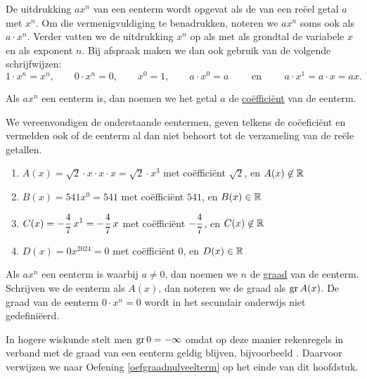\documentclass{ximera}
\begin{document}
De uitdrukking \( ax^n \) van een eenterm wordt opgevat als de  van een re\"eel getal \( a \) met \( x^n \). Om die vermenigvuldiging te benadrukken, noteren we \( ax^n \) soms ook als \( a \cdot x^n \). Verder vatten we de uitdrukking \( x^n \) op als  met als grondtal de variabele \( x \) en als exponent \( n \). Bij afspraak maken we dan ook gebruik van de volgende schrijfwijzen:
\[
1\cdot x^n = x^n, \qquad
0\cdot x^n = 0, \qquad  
x^0 = 1, \qquad 
a\cdot x^0 = a \qquad \text{ en } \qquad 
a\cdot x^1 = a \cdot x = ax.
\]

Als \( ax^n \) een eenterm is, dan noemen we het getal \( a \) de \underline{co\"effici\"ent} van de eenterm.

\begin{example}
We vereenvoudigen de onderstaande eentermen, geven telkens de co\"eefici\"ent en vermelden ook of de eenterm al dan niet behoort tot de verzameling van de re\"ele getallen.
\begin{enumerate}

\item
\( A(x) = \sqrt{2}\cdot x \cdot x \cdot x = \sqrt{2}\cdot x^3 \) met co\"effici\"ent \( \sqrt{2} \), en \( A(x) \not\in \mathbb{R} \)
\item
\( B(x) = 541x^0 = 541 \) met co\"effici\"ent \( 541 \), en \( B(x) \in \mathbb{R} \) 
\item
\( \displaystyle C(x) = -\frac{4}{7}\,x^1 = -\frac{4}{7}\,x \) met co\"effici\"ent \( \displaystyle -\frac{4}{7} \), en \( C(x) \not\in \mathbb{R} \)
\item
\( D(x) = 0 x^{2024} = 0 \) met co\"effici\"ent \( 0 \), en \( D(x) \in \mathbb{R} \) 
\end{enumerate}
\end{example}

Als \( ax^n \) een eenterm is waarbij \( a \neq 0 \), dan noemen we \( n \) de \underline{graad} van de eenterm. Schrijven we de eenterm als \( A(x) \), dan noteren we de graad als \( \operatorname{gr} A(x) \). De graad van de eenterm \( 0\cdot x^n = 0 \) wordt in het secundair onderwijs niet gedefini\"eerd.

\medskip

\begin{Uitbreiding}
In hogere wiskunde stelt men \( \operatorname{gr} 0 = - \infty \) omdat op deze manier rekenregels in verband met de graad van een eenterm geldig blijven, bijvoorbeeld 
. Daarvoor verwijzen we naar Oefening \ref{oefgraadnulveelterm} op het einde van dit hoofdstuk.
\end{Uitbreiding}
\end{document}
